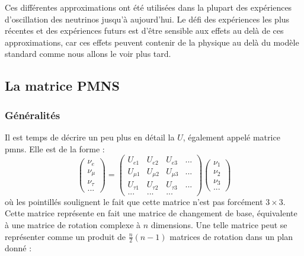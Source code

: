             Ces différentes approximations ont été utilisées dans la plupart des expériences d'oscillation des neutrinos jusqu'à aujourd'hui. Le défi des expériences les plus récentes et des expériences futurs est d'être sensible aux effets au delà de ces approximations, car ces effets peuvent contenir de la physique au delà du modèle standard comme nous allons le voir plus tard.
            
        \subsection{La matrice PMNS}\label{sec::pmns}
            \subsubsection{Généralités}
            Il est temps de décrire un peu plus en détail la $U$, également appelé matrice \gls{pmns}. Elle est de la forme : 
            \begin{equation}
                \left(\begin{matrix}
                     \nu_e \\ \nu_{\mu} \\ \nu_{\tau} \\ ...
                \end{matrix}\right) =
                \left(\begin{matrix}
                    U_{e1} & U_{e2} & U_{e3} & ... \\
                    U_{\mu 1} & U_{\mu 2} & U_{\mu 3} & ... \\
                    U_{\tau 1} & U_{\tau 2} & U_{\tau 3} & ... \\
                    ... & ... & ... &
                \end{matrix}\right)
                \left(\begin{matrix}
                     \nu_1 \\ \nu_2 \\ \nu_3 \\ ...
                \end{matrix}\right)
            \end{equation}
            où les pointillés soulignent le fait que cette matrice n'est pas forcément $3\times 3$. Cette matrice représente en fait une matrice de changement de base, équivalente à une matrice de rotation complexe à $n$ dimensions. Une telle matrice peut se représenter comme un produit de $\frac{n}{2}(n-1)$ matrices de rotation dans un plan donné\cite{Valle2006,Harari1986} : 
